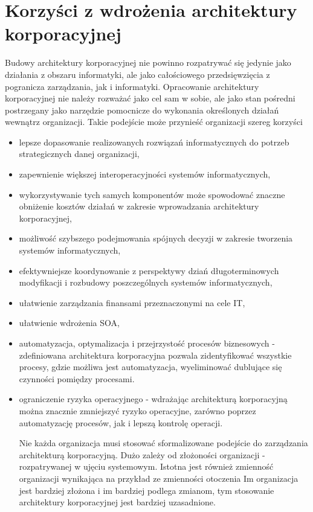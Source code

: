 \section{Korzyści z wdrożenia architektury korporacyjnej}
Budowy architektury korporacyjnej nie powinno rozpatrywać się jedynie jako działania z obszaru informatyki, ale jako całościowego przedsięwzięcia z pogranicza zarządzania, jak i informatyki. Opracowanie architektury korporacyjnej nie należy rozważać jako cel sam w sobie, ale jako stan pośredni postrzegany jako narzędzie pomocnicze do wykonania określonych działań wewnątrz organizacji. Takie podejście może przynieść organizacji szereg korzyści
\begin{itemize}
\item{lepsze dopasowanie realizowanych rozwiązań informatycznych do potrzeb strategicznych danej organizacji,}
\item{zapewnienie większej interoperacyjności systemów informatycznych,}
\item{wykorzystywanie tych samych komponentów może spowodować znaczne obniżenie kosztów działań w zakresie wprowadzania architektury korporacyjnej,}
\item{możliwość szybszego podejmowania spójnych decyzji w zakresie tworzenia systemów informatycznych,}
\item{efektywniejsze koordynowanie z perspektywy dziań długoterminowych modyfikacji i rozbudowy poszczególnych systemów informatycznych,}
\item{ułatwienie zarządzania finansami przeznaczonymi na cele IT,}
\item{ułatwienie wdrożenia SOA,}
\item{automatyzacja, optymalizacja i przejrzystość procesów biznesowych - zdefiniowana architektura korporacyjna pozwala zidentyfikować wszystkie procesy, gdzie możliwa jest automatyzacja, wyeliminować dublujące się czynności pomiędzy procesami.}
\item{ograniczenie ryzyka operacyjnego - wdrażając architekturą korporacyjną można znacznie zmniejszyć ryzyko operacyjne, zarówno poprzez automatyzację procesów, jak i lepszą kontrolę operacji.}

Nie każda organizacja musi stosować sformalizowane podejście do zarządzania architekturą korporacyjną. Dużo zależy od złożoności organizacji - rozpatrywanej w ujęciu systemowym. Istotna jest również zmienność organizacji wynikająca na przykład ze zmienności otoczenia Im organizacja jest bardziej złożona i im bardziej podlega zmianom, tym stosowanie architektury korporacyjnej jest bardziej uzasadnione. \cite{ArchKorpSob}
\end{itemize}


